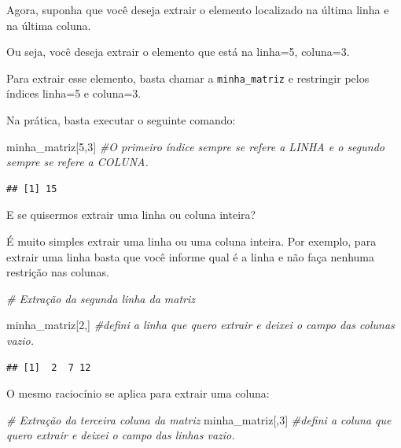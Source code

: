 \documentclass[
]{book}
\newenvironment{Shaded}{\begin{snugshade}}{\end{snugshade}}
\newcommand{\CommentTok}[1]{\textcolor[rgb]{0.56,0.35,0.01}{\textit{#1}}}
\newcommand{\DecValTok}[1]{\textcolor[rgb]{0.00,0.00,0.81}{#1}}
\newcommand{\NormalTok}[1]{#1}
\begin{document}
Agora, suponha que você deseja extrair o elemento localizado na última
linha e na última coluna.

Ou seja, você deseja extrair o elemento que está na linha=5, coluna=3.

Para extrair esse elemento, basta chamar a \texttt{minha\_matriz} e
restringir pelos índices linha=5 e coluna=3.

Na prática, basta executar o seguinte comando:

\begin{Shaded}
\begin{Highlighting}[]
\NormalTok{minha_matriz[}\DecValTok{5}\NormalTok{,}\DecValTok{3}\NormalTok{]   }\CommentTok{#O primeiro índice sempre se refere a LINHA e o segundo sempre se refere a COLUNA.}
\end{Highlighting}
\end{Shaded}

\begin{verbatim}
## [1] 15
\end{verbatim}

E se quisermos extrair uma linha ou coluna inteira?

É muito simples extrair uma linha ou uma coluna inteira. Por exemplo,
para extrair uma linha basta que você informe qual é a linha e não faça
nenhuma restrição nas colunas.

\begin{Shaded}
\begin{Highlighting}[]
\CommentTok{# Extração da segunda linha da matriz}

\NormalTok{minha_matriz[}\DecValTok{2}\NormalTok{,]  }\CommentTok{#defini a linha que quero extrair e deixei o campo das colunas vazio.}
\end{Highlighting}
\end{Shaded}

\begin{verbatim}
## [1]  2  7 12
\end{verbatim}

O mesmo raciocínio se aplica para extrair uma coluna:

\begin{Shaded}
\begin{Highlighting}[]
\CommentTok{# Extração da terceira coluna da matriz}
\NormalTok{minha_matriz[,}\DecValTok{3}\NormalTok{]  }\CommentTok{#defini a coluna que quero extrair e deixei o campo das linhas vazio.}
\end{Highlighting}
\end{Shaded}
\end{document}
